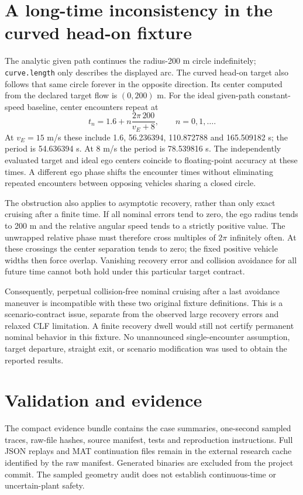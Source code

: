 \documentclass[11pt]{article}
\begin{document}
\section{A long-time inconsistency in the curved head-on fixture}
The analytic given path continues the radius-200 m circle indefinitely;
\texttt{curve.length} only describes the displayed arc. The curved head-on
target also follows that same circle forever in the opposite direction.
Its center computed from the declared target flow is $(0,200)$ m.
For the ideal given-path constant-speed baseline, center encounters repeat at
\[
t_n=1.6+n\frac{2\pi\,200}{v_E+8},\qquad n=0,1,\ldots.
\]
At $v_E=15$ m/s these include 1.6, 56.236394, 110.872788 and 165.509182 s;
the period is 54.636394 s. At 8 m/s the period is 78.539816 s.
The independently evaluated target and ideal ego centers coincide to
floating-point accuracy at these times. A different ego phase shifts the
encounter times without eliminating repeated encounters between opposing
vehicles sharing a closed circle.

The obstruction also applies to asymptotic recovery, rather than only exact
cruising after a finite time. If all nominal errors tend to zero, the ego
radius tends to 200 m and the relative angular speed tends to a strictly
positive value. The unwrapped relative phase must therefore cross multiples
of $2\pi$ infinitely often. At these crossings the center separation tends
to zero; the fixed positive vehicle widths then force overlap. Vanishing
recovery error and collision avoidance for all future time cannot both hold
under this particular target contract.

Consequently, perpetual collision-free nominal cruising after a last
avoidance maneuver is incompatible with these two original fixture
definitions. This is a scenario-contract issue, separate from the observed
large recovery errors and relaxed CLF limitation. A finite recovery dwell
would still not certify permanent nominal behavior in this fixture. No
unannounced single-encounter assumption, target departure, straight exit,
or scenario modification was used to obtain the reported results.

\section{Validation and evidence}

The compact evidence bundle contains the case summaries, one-second sampled
traces, raw-file hashes, source manifest, tests and reproduction instructions.
Full JSON replays and MAT continuation files remain in the external research
cache identified by the raw manifest. Generated binaries are excluded from
the project commit. The sampled geometry audit does not establish
continuous-time or uncertain-plant safety.
\end{document}
